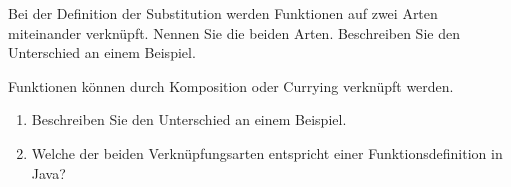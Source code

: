 \begin{card}
	Bei der Definition der Substitution werden Funktionen auf zwei Arten miteinander verknüpft. Nennen Sie die beiden Arten. Beschreiben Sie den Unterschied an einem Beispiel.
	\hr
\end{card}

\begin{card}
	Funktionen können durch Komposition oder Currying verknüpft werden.
	\begin{enumerate}
	\item Beschreiben Sie den Unterschied an einem Beispiel.
	\item Welche der beiden Verknüpfungsarten entspricht einer Funktionsdefinition in Java?
	\end{enumerate}
\end{card}